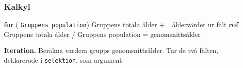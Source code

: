 \documentclass[../main.tex]{subfiles}
\begin{document}
\subsubsection{Kalkyl}

\begin{algorithm}[H]
\SetAlgoLined

\textbf{for} ( \texttt{Gruppens population})\;
    Gruppens totala ålder += åldervärdet ur fält\;
 \textbf{rof}\;
 Gruppens totala ålder / Gruppens population = genomsnittsålder
 \caption{\textbf{Iteration.} Beräkna vardera grupps genomsnittsålder. Tar de två fälten, deklarerade i \texttt{selektion}, som argument.}
 
\end{algorithm}
\end{document}
